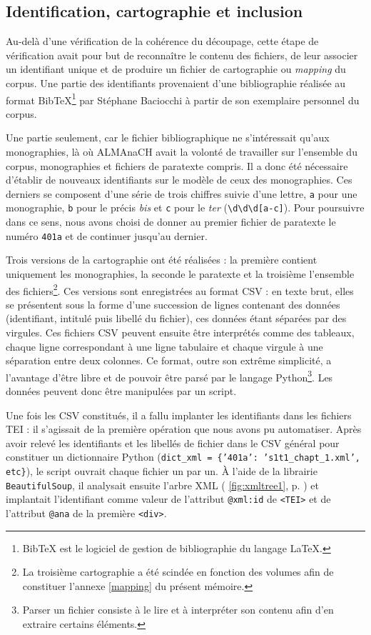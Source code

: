 \subsection{Identification, cartographie et inclusion}

Au-delà d'une vérification de la cohérence du découpage, cette étape de vérification avait pour but de reconnaître le contenu des fichiers, de leur associer un identifiant unique et de produire un fichier de cartographie ou \og \textit{mapping} \fg{} du corpus. Une partie des identifiants provenaient d'une bibliographie réalisée au format BibTeX\footnote{BibTeX est le logiciel de gestion de bibliographie du langage \LaTeX.} par Stéphane Baciocchi à partir de son exemplaire personnel du corpus.

Une partie seulement, car le fichier bibliographique ne s'intéressait qu'aux monographies, là où ALMAnaCH avait la volonté de travailler sur l'ensemble du corpus, monographies et fichiers de paratexte compris. Il a donc été nécessaire d'établir de nouveaux identifiants sur le modèle de ceux des monographies. Ces derniers se composent d'une série de trois chiffres suivie d'une lettre, \texttt{a} pour une monographie, \texttt{b} pour le précis \textit{bis} et \texttt{c} pour le \textit{ter} (\texttt{\textbackslash d\textbackslash d\textbackslash d[a-c]}). Pour poursuivre dans ce sens, nous avons choisi de donner au premier fichier de paratexte le numéro \texttt{401a} et de continuer jusqu'au dernier.

Trois versions de la cartographie ont été réalisées : la première contient uniquement les monographies, la seconde le paratexte et la troisième l'ensemble des fichiers\footnote{La troisième cartographie a été scindée en fonction des volumes afin de constituer l'annexe \ref{mapping} du présent mémoire.}. Ces versions sont enregistrées au format CSV : en texte brut, elles se présentent sous la forme d'une succession de lignes contenant des données (identifiant, intitulé puis libellé du fichier), ces données étant séparées par des virgules. Ces fichiers CSV peuvent ensuite être interprétés comme des tableaux, chaque ligne correspondant à une ligne tabulaire et chaque virgule à une séparation entre deux colonnes. Ce format, outre son extrême simplicité, a l'avantage d'être libre et de pouvoir être parsé par le langage Python\footnote{Parser un fichier consiste à le lire et à interpréter son contenu afin d’en extraire certains éléments.}. Les données peuvent donc être manipulées par un script.

Une fois les CSV constitués, il a fallu implanter les identifiants dans les fichiers TEI : il s'agissait de la première opération que nous avons pu automatiser. Après avoir relevé les identifiants et les libellés de fichier dans le CSV général pour constituer un dictionnaire Python (\texttt{dict\_xml = \{'401a': 's1t1\_chapt\_1.xml', etc\}}), le script ouvrait chaque fichier un par un. À l'aide de la librairie \texttt{BeautifulSoup}, il analysait ensuite l'arbre XML (\fig{} \ref{fig:xmltree1}, p. \pageref{fig:xmltree1}) et implantait l'identifiant comme valeur de l'attribut \texttt{@xml:id} de \texttt{<TEI>} et de l'attribut \texttt{@ana} de la première \texttt{<div>}.

